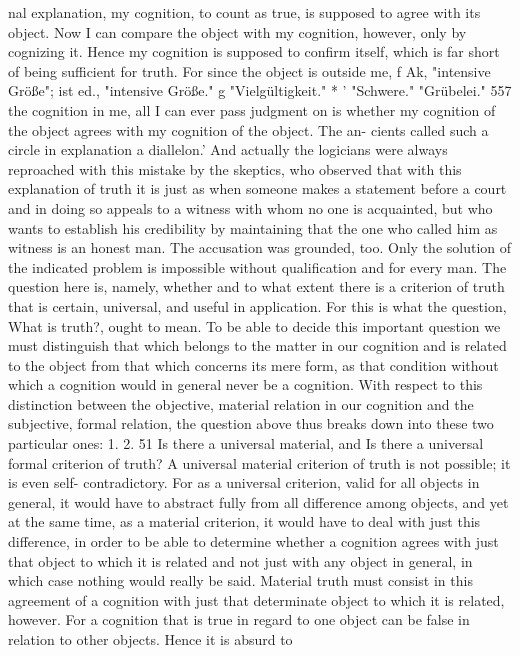 nal explanation, my cognition, to count as true, is supposed to agree with
its object. Now I can compare the object with my cognition, however, only
by cognizing it. Hence my cognition is supposed to confirm itself, which is
far short of being sufficient for truth. For since the object is outside me,
f Ak, "intensive Größe"; ist ed., "intensive Größe."
g "Vielgültigkeit."
*
' "Schwere."
"Grübelei."
557
the cognition in me, all I can ever pass judgment on is whether my
cognition of the object agrees with my cognition of the object. The an-
cients called such a circle in explanation a diallelon.' And actually the
logicians were always reproached with this mistake by the skeptics, who
observed that with this explanation of truth it is just as when someone
makes a statement before a court and in doing so appeals to a witness with
whom no one is acquainted, but who wants to establish his credibility by
maintaining that the one who called him as witness is an honest man. The
accusation was grounded, too. Only the solution of the indicated problem
is impossible without qualification and for every man.
The question here is, namely, whether and to what extent there is a
criterion of truth that is certain, universal, and useful in application. For
this is what the question, What is truth?, ought to mean.
To be able to decide this important question we must distinguish that
which belongs to the matter in our cognition and is related to the object
from that which concerns its mere form, as that condition without which a
cognition would in general never be a cognition. With respect to this
distinction between the objective, material relation in our cognition and the
subjective, formal relation, the question above thus breaks down into these
two particular ones:
1.
2.
51
Is there a universal material, and
Is there a universal formal criterion of truth?
A universal material criterion of truth is not possible; it is even self-
contradictory. For as a universal criterion, valid for all objects in general, it
would have to abstract fully from all difference among objects, and yet at
the same time, as a material criterion, it would have to deal with just this
difference, in order to be able to determine whether a cognition agrees
with just that object to which it is related and not just with any object in
general, in which case nothing would really be said. Material truth must
consist in this agreement of a cognition with just that determinate object
to which it is related, however. For a cognition that is true in regard to one
object can be false in relation to other objects. Hence it is absurd to
